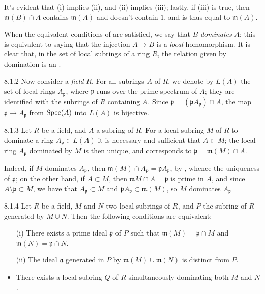 \documentclass{book}
\begin{document}
It's evident that (i) implies (ii), and (ii) implies (iii); lastly, if (iii) is
true, then $\mathfrak{m}(B)\cap A$ contains $\mathfrak{m}(A)$ and doesn't
contain $1$, and is thus equal to $\mathfrak{m}(A)$.

When the equivalent conditions of  are satisfied, we say that $B$
\emph{dominates} $A$; this is equivalent to saying that the injection $A\to B$
is a \emph{local} homomorphism. It is clear that, in the set of local subrings
of a ring $R$, the relation given by domination is an .

\begin{env}{8.1.2}
\label{env-1.8.1.2}
Now consider a \emph{field} $R$. For all subrings $A$ of
$R$, we denote by $L(A)$ the set of local rings $A_\mathfrak{p}$, where
$\mathfrak{p}$ runs over the prime spectrum of $A$; they are identified with the
subrings of $R$ containing $A$. Since
$\mathfrak{p}=(\mathfrak{p}A_\mathfrak{p})\cap A$, the map $\mathfrak{p}\to
A_\mathfrak{p}$ from ${\mathop{\mathrm{Spec}}\nolimits}(A)$ into $L(A)$ is bijective.
\end{env}

\begin{envs}[Lemma]{8.1.3}
\label{lem-1.8.1.3}
Let $R$ be a field, and $A$ a subring of $R$. For a
local subring $M$ of $R$ to dominate a ring $A_\mathfrak{p}\in L(A)$ it is
necessary and sufficient that $A\subset M$; the local ring $A_\mathfrak{p}$
dominated by $M$ is then unique, and corresponds to
$\mathfrak{p}=\mathfrak{m}(M)\cap A$.
\end{envs}

Indeed, if $M$ dominates $A_\mathfrak{p}$, then $\mathfrak{m}(M)\cap
A_\mathfrak{p}=\mathfrak{p}A_\mathfrak{p}$, by , whence the
uniqueness of $\mathfrak{p}$; on the other hand, if $A\subset M$, then
$\mathfrak{m}M\cap A=\mathfrak{p}$ is prime in $A$, and since
$A\setminus\mathfrak{p}\subset M$, we have that $A_\mathfrak{p}\subset M$ and
$\mathfrak{p}A_\mathfrak{p}\subset\mathfrak{m}(M)$, so $M$ dominates
$A_\mathfrak{p}$

\begin{envs}[Lemma]{8.1.4}
\label{lem-1.8.1.4}
Let $R$ be a field, $M$ and $N$ two local
subrings of $R$, and $P$ the subring of $R$ generated by $M\cup N$. Then the
following conditions are equivalent:
\begin{itemize}
  \item[(i)] There exists a prime ideal $\mathfrak{p}$ of $P$ such that
$\mathfrak{m}(M)=\mathfrak{p}\cap M$ and $\mathfrak{m}(N)=\mathfrak{p}\cap N$.
  \item[(ii)] The ideal $\mathfrak{a}$ generated in $P$ by
$\mathfrak{m}(M)\cup\mathfrak{m}(N)$ is distinct from $P$. \item There exists a
local subring $Q$ of $R$ simultaneously dominating both $M$ and $N$.
\end{itemize}
\end{envs}
\end{document}
